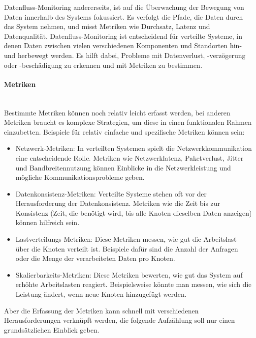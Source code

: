 \documentclass[../vs-script-first-v01.tex]{subfiles}
\begin{document}
Datenfluss-Monitoring andererseits, ist auf die Überwachung der Bewegung von Daten innerhalb des Systems fokussiert. Es verfolgt die Pfade, die Daten durch das System nehmen, und misst Metriken wie Durchsatz, Latenz und Datenqualität. Datenfluss-Monitoring ist entscheidend für verteilte Systeme, in denen Daten zwischen vielen verschiedenen Komponenten und Standorten hin- und herbewegt werden. Es hilft dabei, Probleme mit Datenverlust, -verzögerung oder -beschädigung zu erkennen und mit Metriken zu bestimmen.
\paragraph{Metriken\\\\}
Bestimmte Metriken können noch relativ leicht erfasst werden, bei anderen Metriken braucht es komplexe Strategien, um diese in einen funktionalen Rahmen einzubetten. Beispiele für relativ einfache und  spezifische Metriken können sein: 
\begin{itemize}
\item Netzwerk-Metriken: In verteilten Systemen spielt die Netzwerkkommunikation eine entscheidende Rolle. Metriken wie Netzwerklatenz, Paketverlust, Jitter und Bandbreitennutzung können Einblicke in die Netzwerkleistung und mögliche Kommunikationsprobleme geben.
\item Datenkonsistenz-Metriken: Verteilte Systeme stehen oft vor der Herausforderung der Datenkonsistenz. Metriken wie die Zeit bis zur Konsistenz (Zeit, die benötigt wird, bis alle Knoten dieselben Daten anzeigen) können hilfreich sein.
\item Lastverteilungs-Metriken: Diese Metriken messen, wie gut die Arbeitslast über die Knoten verteilt ist. Beispiele dafür sind die Anzahl der Anfragen oder die Menge der verarbeiteten Daten pro Knoten.
\item Skalierbarkeits-Metriken: Diese Metriken bewerten, wie gut das System auf erhöhte Arbeitslasten reagiert. Beispielsweise könnte man messen, wie sich die Leistung ändert, wenn neue Knoten hinzugefügt werden.
\end{itemize}
Aber die Erfassung der Metriken kann schnell mit verschiedenen Herausforderungen verknüpft werden, die folgende Aufzählung soll nur einen grundsätzlichen Einblick geben. 
\end{document}
